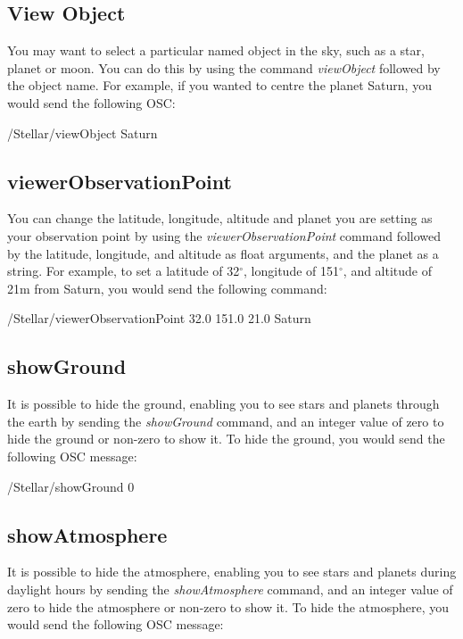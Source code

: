  \subsection{View Object}
 You may want to select a particular named object in the sky, such as a star, planet or moon. You can do this by using the command \textit{viewObject} followed by the object name. For example, if you wanted to centre the planet Saturn, you would send the following OSC:
 
\begin{syntax}	
 	\medskip
 	 /Stellar/viewObject Saturn
 	\medskip
 \end{syntax}
 
 \subsection{viewerObservationPoint}
 You can change the latitude, longitude, altitude and planet you are setting as your observation point by using the \textit{viewerObservationPoint} command followed by the latitude, longitude, and altitude as float arguments, and the planet as a string.  For example, to set a latitude of 32$^{\circ}$, longitude of 151$^{\circ}$, and altitude of 21m from Saturn, you would send the following command:
 
 \begin{syntax}	
 	\medskip
 	/Stellar/viewerObservationPoint 32.0 151.0 21.0 Saturn
 	\medskip
 \end{syntax}
 
 
 \subsection{showGround }
 It is possible to hide the ground, enabling you to see stars and planets through the earth by sending the \textit{showGround } command, and an integer value of zero to hide the ground or non-zero to show it. To hide the ground, you would send the following OSC message:
 
  \begin{syntax}	
 	\medskip
 	/Stellar/showGround 0
 	\medskip
 \end{syntax}

 \subsection{showAtmosphere }
It is possible to hide the atmosphere, enabling you to see stars and planets during daylight hours by sending the \textit{showAtmosphere} command, and an integer value of zero to hide the atmosphere or non-zero to show it. To hide the atmosphere, you would send the following OSC message:

